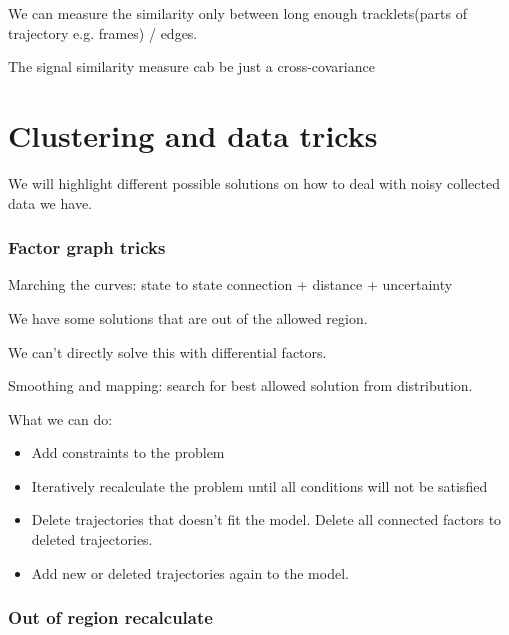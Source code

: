 We can measure the similarity only between long enough tracklets(parts of trajectory e.g. frames) / edges.

The signal similarity measure cab be just a cross-covariance




\section{Clustering and data tricks}

We will highlight different possible solutions on how to deal with noisy collected data we have.


\subsubsection*{Factor graph tricks}

Marching the curves: state to state connection + distance + uncertainty

We have some solutions that are out of the allowed region.

We can't directly solve this with differential factors.

Smoothing and mapping: search for best allowed solution from distribution.

What we can do:

\begin{itemize}
	\item Add constraints to the problem
	\item Iteratively recalculate the problem until all conditions will not be satisfied
	\item Delete trajectories that doesn't fit the model. Delete all connected factors to deleted trajectories.
	\item Add new or deleted trajectories again to the model.
\end{itemize}


\subsubsection*{Out of region recalculate}

